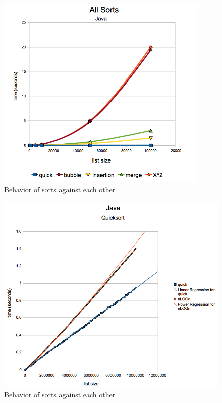 \documentclass[12pt]{amsart}
\begin{document}
\begin{figure}[h]
  \centering
    \includegraphics[width=0.9\textwidth]{JAllSorts.png}
  \caption{Behavior of sorts against each other}
\end{figure}

\begin{figure}[h]
  \centering
    \includegraphics[width=1.0\textwidth]{JHardcoreQS.png}
  \caption{Behavior of sorts against each other}
\end{figure}
\end{document}
